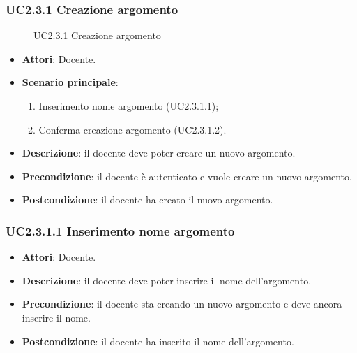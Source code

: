 \subsubsection{UC2.3.1 Creazione argomento}
\begin{figure}[H]
\centering
\noindent{}
\caption{UC2.3.1 Creazione argomento}
\end{figure}
\begin{itemize}
\item \textbf{Attori}: Docente.
\item \textbf{Scenario principale}:
\begin{enumerate}
\item Inserimento nome argomento (UC2.3.1.1);
\item Conferma creazione argomento (UC2.3.1.2).
\end{enumerate}
\item \textbf{Descrizione}: il docente deve poter creare un nuovo argomento.
\item \textbf{Precondizione}: il docente è autenticato e vuole creare un nuovo argomento.
\item \textbf{Postcondizione}: il docente ha creato il nuovo argomento.
\end{itemize}
\subsubsection{UC2.3.1.1 Inserimento nome argomento}
\begin{itemize}
\item \textbf{Attori}: Docente.
\item \textbf{Descrizione}: il docente deve poter inserire il nome dell'argomento.
\item \textbf{Precondizione}: il docente sta creando un nuovo argomento e deve ancora inserire il nome.
\item \textbf{Postcondizione}: il docente ha inserito il nome dell'argomento.
\end{itemize}
